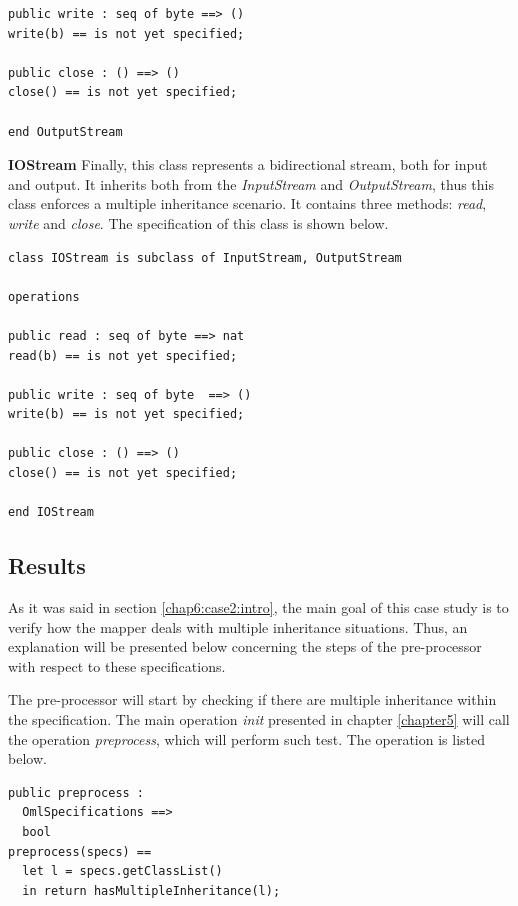 \begin{description}
\begin{lstlisting}
public write : seq of byte ==> ()
write(b) == is not yet specified;

public close : () ==> ()
close() == is not yet specified;

end OutputStream
\end{lstlisting}
\bigskip

\item{\textbf{IOStream}} Finally, this class represents a bidirectional stream, both for input and output. It inherits both from the \textit{InputStream} and \textit{OutputStream}, thus this class enforces a multiple inheritance scenario. It contains three methods: \textit{read}, \textit{write} and \textit{close}. The specification of this class is shown below.

\bigskip
\begin{lstlisting}
class IOStream is subclass of InputStream, OutputStream

operations

public read : seq of byte ==> nat
read(b) == is not yet specified;

public write : seq of byte  ==> ()
write(b) == is not yet specified;

public close : () ==> ()
close() == is not yet specified;

end IOStream
\end{lstlisting}
\bigskip

\end{description}


\subsection{Results}
\label{chap6:case2:res}

As it was said in section \ref{chap6:case2:intro}, the main goal of this case study is to verify how the mapper deals with multiple inheritance situations. Thus, an explanation will be presented below concerning the steps of the pre-processor with respect to these specifications.

The pre-processor will start by checking if there are multiple inheritance within the specification.  The main operation \textit{init} presented in chapter \ref{chapter5} will call the operation \textit{preprocess}, which will perform such test. The operation is listed below.

\bigskip
\begin{lstlisting}
public preprocess : 
  OmlSpecifications ==>
  bool
preprocess(specs) == 
  let l = specs.getClassList()
  in return hasMultipleInheritance(l);
\end{lstlisting}
\bigskip


